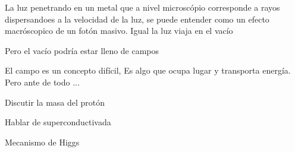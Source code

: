 \documentclass[%
xcolor=pdftex,dvipsnames,table%
]{beamer}
\begin{document}
\begin{frame}
  La luz penetrando en un metal que a nivel microscópio corresponde a rayos dispersandoes a la velocidad de la luz, se puede entender como un efecto macróscopico de un fotón masivo. Igual la luz viaja en el vacío
\end{frame}
\begin{frame}
  Pero el vacío podría estar lleno de campos
\end{frame}
\begin{frame}
  El campo es un concepto difícil, Es algo que ocupa lugar y transporta energía. Pero ante de todo ...  
\end{frame}
\begin{frame}
  Discutir la masa del protón
\end{frame}
\begin{frame}
  Hablar de superconductivada
\end{frame}
\begin{frame}
  Mecanismo de Higgs
\end{frame}
\end{document}
